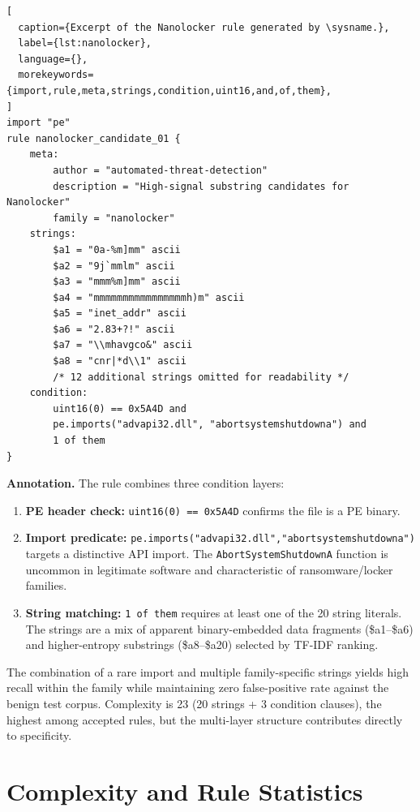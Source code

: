 \documentclass[10pt,twocolumn]{article}
\newcommand{\sysname}{\textsc{LLM-YARA}\xspace}
\begin{document}
\begin{lstlisting}[
  caption={Excerpt of the Nanolocker rule generated by \sysname.},
  label={lst:nanolocker},
  language={},
  morekeywords={import,rule,meta,strings,condition,uint16,and,of,them},
]
import "pe"
rule nanolocker_candidate_01 {
    meta:
        author = "automated-threat-detection"
        description = "High-signal substring candidates for Nanolocker"
        family = "nanolocker"
    strings:
        $a1 = "0a-%m]mm" ascii
        $a2 = "9j`mmlm" ascii
        $a3 = "mmm%m]mm" ascii
        $a4 = "mmmmmmmmmmmmmmmmh)m" ascii
        $a5 = "inet_addr" ascii
        $a6 = "2.83+?!" ascii
        $a7 = "\\mhavgco&" ascii
        $a8 = "cnr|*d\\1" ascii
        /* 12 additional strings omitted for readability */
    condition:
        uint16(0) == 0x5A4D and
        pe.imports("advapi32.dll", "abortsystemshutdowna") and
        1 of them
}
\end{lstlisting}

\textbf{Annotation.}  The rule combines three condition layers:
\begin{enumerate}[nosep,leftmargin=1.2em]
  \item \textbf{PE header check:} \texttt{uint16(0) == 0x5A4D}
    confirms the file is a PE binary.
  \item \textbf{Import predicate:}
    \texttt{pe.imports("advapi32.dll","abortsystemshutdowna")}
    targets a distinctive API import.  The
    \texttt{AbortSystemShutdownA} function is uncommon in legitimate
    software and characteristic of ransomware/locker families.
  \item \textbf{String matching:} \texttt{1 of them} requires at
    least one of the 20 string literals.  The strings are a mix of
    apparent binary-embedded data fragments (\$a1--\$a6) and
    higher-entropy substrings (\$a8--\$a20) selected by TF-IDF ranking.
\end{enumerate}

The combination of a rare import and multiple family-specific strings
yields high recall within the family while maintaining zero
false-positive rate against the benign test corpus.  Complexity is 23
(20 strings + 3 condition clauses), the highest among accepted rules,
but the multi-layer structure contributes directly to specificity.

\section{Complexity and Rule Statistics}
\label{app:complexity}
\end{document}
